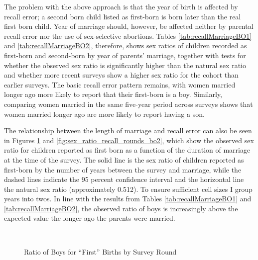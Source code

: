 \documentclass[12pt,letterpaper]{article}
\begin{document}
The problem with the above approach is that the year of birth is affected by recall error; 
a second born child listed as first-born is born later than the real first born child.
Year of marriage should, however, be affected neither by parental recall error 
nor the use of sex-selective abortions.
Tables \ref{tab:recallMarriageBO1} and \ref{tab:recallMarriageBO2}, therefore, shows sex 
ratios of children recorded as first-born and second-born by year of parents' marriage, 
together with tests for whether the observed sex ratio is significantly higher than the 
natural sex ratio and whether more recent surveys show a higher sex ratio for the cohort 
than earlier surveys.
The basic recall error pattern remains, with women married longer ago more
likely to report that their first-born is a boy.
Similarly, comparing women married in the same five-year period across surveys shows
that women married longer ago are more likely to report having a son.







The relationship between the length of marriage and recall error can also be seen in 
Figures \ref{fig:sex_ratio_recall_rounds_bo1} and \ref{fig:sex_ratio_recall_rounds_bo2}, 
which show the observed sex ratio for children reported as first born as a function of 
the duration of marriage at the time of the survey.
The solid line is the sex ratio of children reported as first-born by the number of years 
between the survey and marriage, while the dashed lines indicate the 95 percent confidence 
interval and the horizontal line the natural sex ratio (approximately 0.512).
To ensure sufficient cell sizes I group years into twos.
In line with the results from Tables \ref{tab:recallMarriageBO1} and 
\ref{tab:recallMarriageBO2}, the observed ratio of boys is increasingly above the expected 
value the longer ago the parents were married.

\begin{figure}
\centering
{}
 \\
\caption{Ratio of Boys for ``First'' Births by Survey Round}
\label{fig:sex_ratio_recall_rounds_bo1}
\end{figure}
\end{document}
